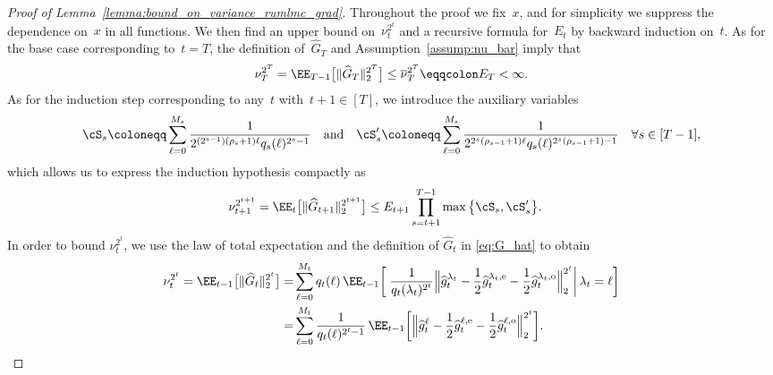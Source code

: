 \documentclass[11pt]{article}
\let\hat\widehat
\begin{document}
\begin{proof}[Proof of Lemma~\ref{lemma:bound_on_variance_rumlmc_grad}] 

Throughout the proof we fix~$x$, and for simplicity we suppress the dependence on~$x$ in all functions. We then find an upper bound on~$\nu_t^{2^t}$ and a recursive formula for~$E_t$ by backward induction on~$t$. As for the base case corresponding to~$t=T$, the definition of~$\hat{G}_T$ and Assumption~\ref{assump:nu_bar} imply that
\begin{align*}
    \nu_T^{2^T} = \EE_{T-1}\big[ \|\hat{G}_T\|_2^{2^T} \big] \leq \overline\nu_T^{2^T} \eqqcolon E_T<\infty.
\end{align*}
As for the induction step corresponding to any~$t$ with~$t+1\in[T]$, we introduce the auxiliary variables
\begin{align}
\label{eq:S-definition}
    \cS_s \coloneqq \sum_{\ell=0}^{M_s}\frac{1}{2^{(2^{s-1})(\rho_s+1)\ell} q_s(\ell)^{2^{s}-1}} \quad\text{and} \quad\cS_s^\prime\coloneqq\sum_{\ell=0}^{M_s}\frac{1}{2^{2^s(\rho_{s-1}+1) \ell} q_s(\ell)^{2^{s}(\rho_{s-1}+1)-1}} \quad \forall s\in[T-1],
\end{align}
which allows us to express the induction hypothesis compactly as
\begin{equation}
  \begin{aligned}\label{eq:moment_lemma_inductive_hypothesis_grad}
    \nu_{t+1}^{2^{t+1}} &= \EE_t\big[\|\hat{G}_{t+1}\|_{2}^{2^{t+1}}\big]\leq E_{t+1}\prod_{s=t+1}^{T-1} \max\big\{ \cS_s, \cS_s^\prime \big\}.
\end{aligned}  
\end{equation}
In order to bound $\nu_t^{2^t}$, we use the law of total expectation and the definition of $\hat{G}_t$ in \eqref{eq:G_hat} to obtain
\begin{equation}
\begin{aligned} \label{eq:telescoping_step_rumlmc}
    \nu_t^{2^t}=\EE_{t-1} \big[ \| \hat{G}_t \|^{2^t}_{2} \big] 
    = & \sum_{\ell=0}^{M_t} q_t(\ell) \, \EE_{t-1} \bigg[ \left. \frac{1}{q_t(\lambda_t)^{2^t}} \Big\| \hat{g}_t^{\lambda_t}-\frac{1}{2}\hat{g}_t^{\lambda_t, {\rm e}}-\frac{1}{2}\hat{g}_t^{\lambda_t, {\rm o}} \Big\|^{2^t}_{2} \right| \lambda_t=\ell \bigg]\\
    = & \sum_{\ell=0}^{M_t} \frac{1}{q_t(\ell)^{2^t-1}} \, \EE_{t-1} \bigg[ \Big\| \hat{g}_t^{\ell}-\frac{1}{2}\hat{g}_t^{\ell, {\rm e}}-\frac{1}{2}\hat{g}_t^{\ell, {\rm o}} \Big\|^{2^t}_{2} \bigg].
\end{aligned}
\end{equation}

\end{proof}
\end{document}
